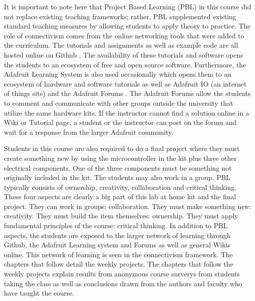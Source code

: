 It is important to note here that Project Based Learning (PBL) in this
course did not replace existing teaching frameworks; rather, PBL
supplemented existing standard teaching measures by allowing students
to apply theory to practice. The role of connectivism comes from the
online networking tools that were added to the curriculum. The
tutorials and assignments as well as example code are all hosted
online on Github \cite{Github}. The availability of these
tutorials and software opens the students to an ecosystem of free and
open source software. Furthermore, the Adafruit Learning System is
also used occasionally which opens them to an ecosystem of hardware
and software tutorials as well as Adafruit IO (an internet of things
site) and the Adafruit Forums \cite{Adafruit}. The Adafruit Forums
allow the students to comment and communicate with other groups
outside the university that utilize the same hardware kits. If the
instructor cannot find a solution online in a Wiki or Tutorial page, a
student or the instructor can post on the forum and wait for a
response from the larger Adafruit community. 

Students in this course are also required to do a final project
where they must create something new by using the microcontroller in
the kit plus three other electrical components. One of the three
components must be something not originally included in the kit. The
students may also work in a group. PBL typically consists of
ownership, creativity, collaboration and critical thinking. These four
aspects are clearly a big part of this lab at home kit and the final
project. They can work in groups: collaboration. They must make
something new: creativity. They must build the item themselves:
ownership. They must apply fundamental principles of the course:
critical thinking. In addition to PBL aspects, the students are
exposed to the larger network of learning through Github, the Adafruit
Learning system and Forums as well as general Wikis online. This
network of learning is seen in the connectivism framework. The
chapters that follow detail the weekly projects. The chapters that
follow the weekly projects explain results from anonymous course
surverys from students taking the class as well as conclusions drawn
from the authors and faculty who have taught the course. 



